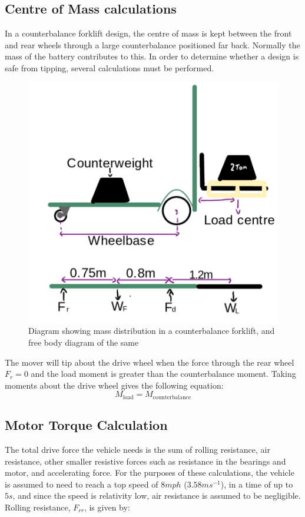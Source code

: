\documentclass[12pt]{article}
\begin{document}
\subsection{Centre of Mass calculations}
In a counterbalance forklift design, the centre of mass is kept between the front and rear wheels through a large counterbalance positioned far back. Normally the mass of the battery contributes to this. In order to determine whether a design  is  safe from tipping, several calculations must be performed.
\begin{figure} [H]
    \centering
    \includegraphics[width=0.5\linewidth]{Tipping Calculations.png}
    \caption{Diagram showing mass distribution in a counterbalance forklift, and free body diagram of the same}
    
    
\end{figure}
The mover will tip about the drive wheel when the force through the rear wheel  \( F_r = 0 \) and the load moment is greater than the counterbalance moment. 
Taking moments about the drive wheel gives the following equation:
\begin{equation}
    M_{\text{load}} = M_{\text{counterbalance}}
\end{equation}

\subsection{Motor Torque Calculation}

The total drive force the vehicle needs is the sum of rolling resistance, air resistance, other smaller resistive forces such as resistance in the bearings and motor, and accelerating force. For the purposes of these calculations, the vehicle is assumed to need to reach a top speed of $8mph$ ($3.58ms^{-1}$), in a time of up to $5s$, and since the speed is relativity low, air resistance is assumed to be negligible. Rolling resistance, $F_{rr}$, is given by:
\end{document}
